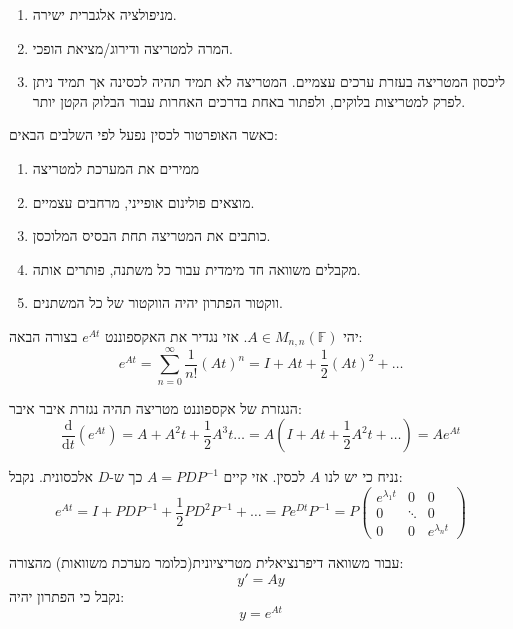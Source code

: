 \documentclass{tstextbook}
\begin{document}
\begin{enumerate}
  \item מניפולציה אלגברית ישירה. 


  \item המרה למטריצה ודירוג/מציאת הופכי. 


  \item ליכסון המטריצה בעזרת ערכים עצמיים. המטריצה לא תמיד תהיה לכסינה אך תמיד ניתן לפרק למטריצות בלוקים, ולפתור באחת בדרכים האחרות עבור הבלוק הקטן יותר. 


\end{enumerate}
\begin{proposition}
כאשר האופרטור לכסין נפעל לפי השלבים הבאים:

  \begin{enumerate}
    \item ממירים את המערכת למטריצה 


    \item מוצאים פולינום אופייני, מרחבים עצמיים. 


    \item כותבים את המטריצה תחת הבסיס המלוכסן. 


    \item מקבלים משוואה חד מימדית עבור כל משתנה, פותרים אותה. 


    \item ווקטור הפתרון יהיה הווקטור של כל המשתנים.  


  \end{enumerate}
\end{proposition}
\begin{definition}
יהי \(A\in M_{n,n}\left( \mathbb{F}  \right)\). אזי נגדיר את האקספוננט \(e^{At}\) בצורה הבאה:
$$e^{ At }=\sum_{n=0}^{\infty}\frac{1}{n!}(At)^{n}= I+At+ \frac{1}{2}(At)^{2}+\dots$$

\end{definition}
\begin{proposition}
הנגזרת של אקספוננט מטריצה תהיה נגזרת איבר איבר:
$$\frac{\mathrm{d} }{\mathrm{d} t} (e^{ At })=A+A^{2}t+ \frac{1}{2}A^{3}t\dots=A\left( I+At+\frac{1}{2}A^{2}t+\dots \right)=Ae^{ At }$$

\end{proposition}
\begin{proposition}
נניח כי יש לנו \(A\) לכסין. אזי קיים \(A=P D P ^{-1}\) כך ש-\(D\) אלכסונית. נקבל:
$$e^{ At }=I+PDP ^{-1} + \frac{1}{2} P D^{2} P ^{-1}+\dots=Pe^{ Dt }P ^{-1}=P \begin{pmatrix}e ^{ \lambda_{1}t} & 0 & 0 \\0 & \ddots & 0 \\0 & 0 & e^{ \lambda_{n} t}
\end{pmatrix}$$

\end{proposition}
\begin{proposition}
עבור משוואה דיפרנציאלית מטריציונית(כלומר מערכת משוואות) מהצורה:
$$y'=Ay$$
נקבל כי הפתרון יהיה:
$$y=e^{At}$$

\end{proposition}
\end{document}
